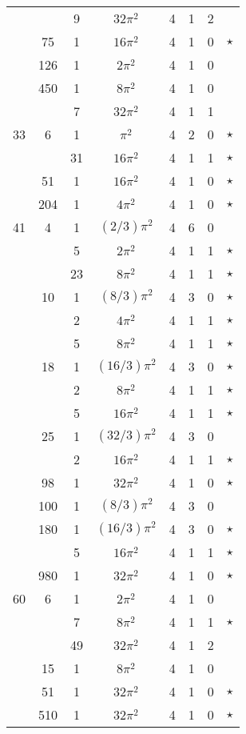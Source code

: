 \documentclass[12pt]{amsart}
\begin{document}
\begin{tabular}{ccc|ccccc}
 &  & 9 & $32\pi^2$ & 4 & 1 & 2 &  \\
 & 75 & 1 & $16\pi^2$ & 4 & 1 & 0 & $\star$ \\
 & 126 & 1 & $2\pi^2$ & 4 & 1 & 0 &  \\
 & 450 & 1 & $8\pi^2$ & 4 & 1 & 0 &  \\
 &  & 7 & $32\pi^2$ & 4 & 1 & 1 &  \\
33 & 6 & 1 & $\pi^2$ & 4 & 2 & 0 & $\star$ \\
 &  & 31 & $16\pi^2$ & 4 & 1 & 1 & $\star$ \\
 & 51 & 1 & $16\pi^2$ & 4 & 1 & 0 & $\star$ \\
 & 204 & 1 & $4\pi^2$ & 4 & 1 & 0 & $\star$ \\
41 & 4 & 1 & $(2/3)\pi^2$ & 4 & 6 & 0 &  \\
 &  & 5 & $2\pi^2$ & 4 & 1 & 1 & $\star$ \\
 &  & 23 & $8\pi^2$ & 4 & 1 & 1 & $\star$ \\
 & 10 & 1 & $(8/3)\pi^2$ & 4 & 3 & 0 & $\star$ \\
 &  & 2 & $4\pi^2$ & 4 & 1 & 1 & $\star$ \\
 &  & 5 & $8\pi^2$ & 4 & 1 & 1 & $\star$ \\
 & 18 & 1 & $(16/3)\pi^2$ & 4 & 3 & 0 & $\star$ \\
 &  & 2 & $8\pi^2$ & 4 & 1 & 1 & $\star$ \\
 &  & 5 & $16\pi^2$ & 4 & 1 & 1 & $\star$ \\
 & 25 & 1 & $(32/3)\pi^2$ & 4 & 3 & 0 &  \\
 &  & 2 & $16\pi^2$ & 4 & 1 & 1 & $\star$ \\
 & 98 & 1 & $32\pi^2$ & 4 & 1 & 0 & $\star$ \\
 & 100 & 1 & $(8/3)\pi^2$ & 4 & 3 & 0 &  \\
 & 180 & 1 & $(16/3)\pi^2$ & 4 & 3 & 0 & $\star$ \\
 &  & 5 & $16\pi^2$ & 4 & 1 & 1 & $\star$ \\
 & 980 & 1 & $32\pi^2$ & 4 & 1 & 0 & $\star$ \\
60 & 6 & 1 & $2\pi^2$ & 4 & 1 & 0 &  \\
 &  & 7 & $8\pi^2$ & 4 & 1 & 1 & $\star$ \\
 &  & 49 & $32\pi^2$ & 4 & 1 & 2 &  \\
 & 15 & 1 & $8\pi^2$ & 4 & 1 & 0 &  \\
 & 51 & 1 & $32\pi^2$ & 4 & 1 & 0 & $\star$ \\
 & 510 & 1 & $32\pi^2$ & 4 & 1 & 0 & $\star$ \\

\end{tabular}
\end{document}

